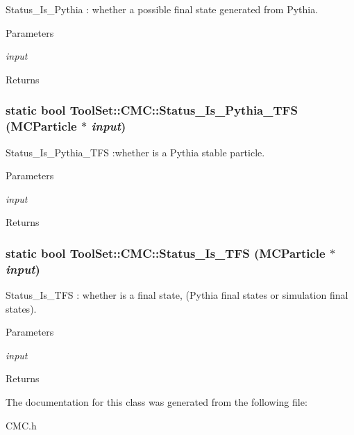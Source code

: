 Status\_\-Is\_\-Pythia : whether a possible final state generated from Pythia. 
\begin{DoxyParams}{Parameters}
\item[{\em input}]\end{DoxyParams}
\begin{DoxyReturn}{Returns}

\end{DoxyReturn}
\hypertarget{classToolSet_1_1CMC_aef5a206838a69936e98ea22a1c36e143}{
\subsubsection[{Status\_\-Is\_\-Pythia\_\-TFS}]{\setlength{\rightskip}{0pt plus 5cm}static bool ToolSet::CMC::Status\_\-Is\_\-Pythia\_\-TFS (MCParticle $\ast$ {\em input})}}
\label{classToolSet_1_1CMC_aef5a206838a69936e98ea22a1c36e143}


Status\_\-Is\_\-Pythia\_\-TFS :whether is a Pythia stable particle. 
\begin{DoxyParams}{Parameters}
\item[{\em input}]\end{DoxyParams}
\begin{DoxyReturn}{Returns}

\end{DoxyReturn}
\hypertarget{classToolSet_1_1CMC_a662c5f9d64c7916f988e4ff15598d4ed}{
\subsubsection[{Status\_\-Is\_\-TFS}]{\setlength{\rightskip}{0pt plus 5cm}static bool ToolSet::CMC::Status\_\-Is\_\-TFS (MCParticle $\ast$ {\em input})}}
\label{classToolSet_1_1CMC_a662c5f9d64c7916f988e4ff15598d4ed}


Status\_\-Is\_\-TFS : whether is a final state, (Pythia final states or simulation final states). 
\begin{DoxyParams}{Parameters}
\item[{\em input}]\end{DoxyParams}
\begin{DoxyReturn}{Returns}

\end{DoxyReturn}


The documentation for this class was generated from the following file:\begin{DoxyCompactItemize}
\item 
CMC.h\end{DoxyCompactItemize}
